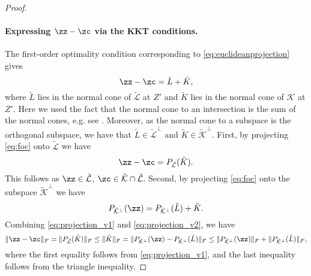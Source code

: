 \begin{proof}
%  



\paragraph{Expressing  $\zz - \zc$ via the KKT conditions.} %
The first-order optimality condition corresponding to \eqref{eq:euclideanprojection} gives 
\begin{equation} \label{eq:foc}
\zz - \zc = \tilde{L}  + \tilde{K},
\end{equation}
where $\tilde{L}$ lies in the normal cone of $\tilde{\mathcal{L}}$ at $Z'$ and $\tilde{K}$ lies in the normal cone of $\mathcal{K}$ at $Z'$. Here 
we used the fact  that the normal cone to an intersection is the sum of the normal cones, e.g. see \cite[Corollary 23.8.1]{rockafellar}.  Moreover, as  the normal cone to a subspace is the orthogonal subspace, we have that  $\tilde{L} \in {\tilde{\mathcal{L}}}^\perp$ and $\tilde{K}\in \tilde{\mathcal{K}}^\perp$. First, by projecting \eqref{eq:foc} onto $\tilde{\mathcal{L}}$ we have
\begin{equation} \label{eq:projection_v1}
\zz - \zc = P_{\tilde{\mathcal{L}}}(\tilde{K}).
\end{equation}
This follows as  $\zz \in \tilde{\mathcal{L}}$, $\zc \in \tilde{\mathcal{K}} \cap \tilde{\mathcal{L}}$.  Second, by projecting \eqref{eq:foc} onto the subspace $\tilde{\mathcal{K}}^\perp$ we have
\begin{equation} \label{eq:projection_v2}
P_{\tilde{\mathcal{K}}^\perp} (\zz)  = P_{\tilde{\mathcal{K}}^\perp}(\tilde{L}) + \tilde{K}.
\end{equation}
Combining  \eqref{eq:projection_v1} and \eqref{eq:projection_v2}, we have
\begin{equation} \label{eq:zhatx_firstbound}
\| \zz - \zc \|_F = \| P_{\tilde{\mathcal{L}}}(\tilde{K}) \|_F \leq \| \tilde{K} \|_F =  \| P_{\tilde{\mathcal{K}}^\perp} (\zz) - P_{\tilde{\mathcal{K}}^\perp}(\tilde{L}) \|_F \leq \| P_{\tilde{\mathcal{K}}^\perp} (\zz) \|_F + \| P_{\tilde{\mathcal{K}}^\perp}(\tilde{L}) \|_F,
\end{equation}
where  the first equality follows from \eqref{eq:projection_v1}, and the last  inequality follows from  the triangle inequality.  


\end{proof}
